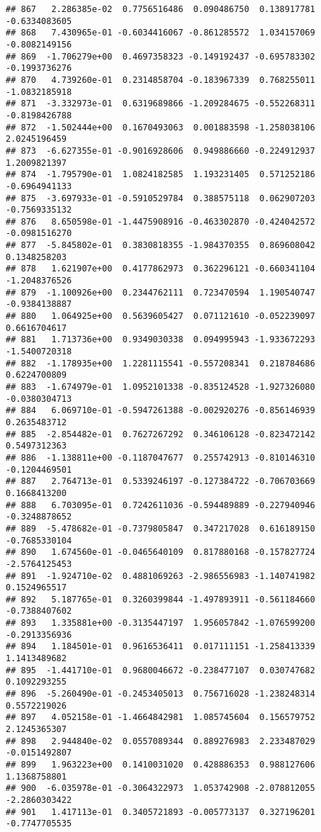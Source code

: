 \documentclass[
]{article}
\begin{document}
\begin{verbatim}
## 867   2.286385e-02  0.7756516486  0.090486750  0.138917781 -0.6334083605
## 868   7.430965e-01 -0.6034416067 -0.861285572  1.034157069 -0.8082149156
## 869  -1.706279e+00  0.4697358323 -0.149192437 -0.695783302 -0.1993736276
## 870   4.739260e-01  0.2314858704 -0.183967339  0.768255011 -1.0832185918
## 871  -3.332973e-01  0.6319689866 -1.209284675 -0.552268311 -0.8198426788
## 872  -1.502444e+00  0.1670493063  0.001883598 -1.258038106  2.0245196459
## 873  -6.627355e-01 -0.9016928606  0.949886660 -0.224912937  1.2009821397
## 874  -1.795790e-01  1.0824182585  1.193231405  0.571252186 -0.6964941133
## 875  -3.697933e-01 -0.5910529784  0.388575118  0.062907203 -0.7569335132
## 876   8.650598e-01 -1.4475908916 -0.463302870 -0.424042572 -0.0981516270
## 877  -5.845802e-01  0.3830818355 -1.984370355  0.869608042  0.1348258203
## 878   1.621907e+00  0.4177862973  0.362296121 -0.660341104 -1.2048376526
## 879  -1.100926e+00  0.2344762111  0.723470594  1.190540747 -0.9384138887
## 880   1.064925e+00  0.5639605427  0.071121610 -0.052239097  0.6616704617
## 881   1.713736e+00  0.9349030338  0.094995943 -1.933672293 -1.5400720318
## 882  -1.178935e+00  1.2281115541 -0.557208341  0.218784686  0.6224700809
## 883  -1.674979e-01  1.0952101338 -0.835124528 -1.927326080 -0.0380304713
## 884   6.069710e-01 -0.5947261388 -0.002920276 -0.856146939  0.2635483712
## 885  -2.854482e-01  0.7627267292  0.346106128 -0.823472142  0.5497312363
## 886  -1.138811e+00 -0.1187047677  0.255742913 -0.810146310 -0.1204469501
## 887   2.764713e-01  0.5339246197 -0.127384722 -0.706703669  0.1668413200
## 888   6.703095e-01  0.7242611036 -0.594489889 -0.227940946 -0.3248878652
## 889  -5.478682e-01 -0.7379805847  0.347217028  0.616189150 -0.7685330104
## 890   1.674560e-01 -0.0465640109  0.817880168 -0.157827724 -2.5764125453
## 891  -1.924710e-02  0.4881069263 -2.986556983 -1.140741982  0.1524965517
## 892   5.187765e-01  0.3260399844 -1.497893911 -0.561184660 -0.7388407602
## 893   1.335881e+00 -0.3135447197  1.956057842 -1.076599200 -0.2913356936
## 894   1.184501e-01  0.9616536411  0.017111151 -1.258413339  1.1413489682
## 895  -1.441710e-01  0.9680046672 -0.238477107  0.030747682  0.1092293255
## 896  -5.260490e-01 -0.2453405013  0.756716028 -1.238248314  0.5572219026
## 897   4.052158e-01 -1.4664842981  1.085745604  0.156579752  2.1245365307
## 898   2.944840e-02  0.0557089344  0.889276983  2.233487029 -0.0151492807
## 899   1.963223e+00  0.1410031020  0.428886353  0.988127606  1.1368758801
## 900  -6.035978e-01 -0.3064322973  1.053742908 -2.078812055 -2.2860303422
## 901   1.417113e-01  0.3405721893 -0.005773137  0.327196201 -0.7747705535

\end{verbatim}
\end{document}
